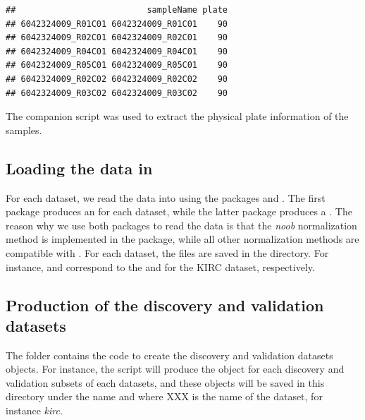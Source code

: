 \documentclass[12pt]{article}
\begin{document}
\begin{knitrout}
\color{fgcolor}\begin{kframe}
\begin{alltt}
\hlstd{(}\hlstd{))}
\hlstd{(}\hlstd{)}
\end{alltt}
\begin{verbatim}
##                          sampleName plate
## 6042324009_R01C01 6042324009_R01C01    90
## 6042324009_R02C01 6042324009_R02C01    90
## 6042324009_R04C01 6042324009_R04C01    90
## 6042324009_R05C01 6042324009_R05C01    90
## 6042324009_R02C02 6042324009_R02C02    90
## 6042324009_R03C02 6042324009_R03C02    90
\end{verbatim}
\end{kframe}
\end{knitrout}

The companion script  was used to extract the physical plate information of the samples. 

\subsection{Loading the data in \R}

For each dataset, we read the data into \R{} using the packages  and . The first package produces an  for each dataset, while the latter package produces a . The reason why we use both packages to read the data is that the \textit{noob} normalization method is implemented in the  package, while all other normalization methods are compatible with . For each dataset, the files are saved in the  directory. For instance,  and  correspond to the  and  for the KIRC dataset, respectively. 

\subsection{Production of the discovery and validation datasets}
The folder  contains the code to create the discovery and validation datasets objects. For instance, the script  will produce the  object for each discovery and validation subsets of each datasets, and these objects will be saved in this directory under the name  and  where XXX is the name of the dataset, for instance \textit{kirc}. 
\end{document}
